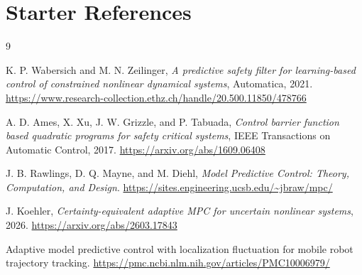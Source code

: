 \documentclass[11pt,a4paper]{article}
\begin{document}
\section{Starter References}
\begin{thebibliography}{9}

K. P. Wabersich and M. N. Zeilinger,
\emph{A predictive safety filter for learning-based control of constrained nonlinear dynamical systems},
Automatica, 2021.
\url{https://www.research-collection.ethz.ch/handle/20.500.11850/478766}

A. D. Ames, X. Xu, J. W. Grizzle, and P. Tabuada,
\emph{Control barrier function based quadratic programs for safety critical systems},
IEEE Transactions on Automatic Control, 2017.
\url{https://arxiv.org/abs/1609.06408}

J. B. Rawlings, D. Q. Mayne, and M. Diehl,
\emph{Model Predictive Control: Theory, Computation, and Design}.
\url{https://sites.engineering.ucsb.edu/~jbraw/mpc/}

J. Koehler,
\emph{Certainty-equivalent adaptive MPC for uncertain nonlinear systems}, 2026.
\url{https://arxiv.org/abs/2603.17843}

Adaptive model predictive control with localization fluctuation for mobile robot trajectory tracking.
\url{https://pmc.ncbi.nlm.nih.gov/articles/PMC10006979/}

\end{thebibliography}
\end{document}
